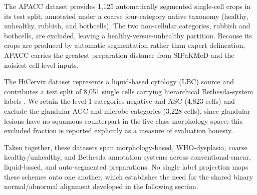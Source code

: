 The APACC dataset provides 1{,}125 automatically segmented single-cell crops in its test split, annotated under a coarse four-category native taxonomy (healthy, unhealthy, rubbish, and bothcells). The two non-cellular categories, rubbish and bothcells, are excluded, leaving a healthy-versus-unhealthy partition. Because its crops are produced by automatic segmentation rather than expert delineation, APACC carries the greatest preparation distance from SIPaKMeD and the noisiest cell-level inputs.

The HiCervix dataset \citep{cai2024hicervix} represents a liquid-based cytology (LBC) source and contributes a test split of 8{,}051 single cells carrying hierarchical Bethesda-system labels \citep{nayar2015bethesda}. We retain the level-1 categories negative and ASC (4{,}823 cells) and exclude the glandular AGC and microbe categories (3{,}228 cells), since glandular lesions have no squamous counterpart in the five-class morphology space; this excluded fraction is reported explicitly as a measure of evaluation honesty.

Taken together, these datasets span morphology-based, WHO-dysplasia, coarse healthy/unhealthy, and Bethesda annotation systems across conventional-smear, liquid-based, and auto-segmented preparations. No single label projection maps these schemes onto one another, which establishes the need for the shared binary normal/abnormal alignment developed in the following section.